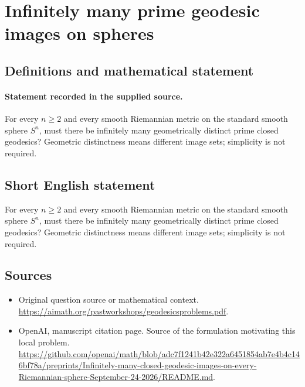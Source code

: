 \documentclass[11pt]{article}
\begin{document}
\section*{Infinitely many prime geodesic images on spheres}\label{30007156}
\subsection{Definitions and mathematical statement}
\paragraph{Statement recorded in the supplied source.}
For every $n\geq 2$ and every smooth Riemannian metric on the standard smooth sphere $S^{n}$, must there be infinitely many geometrically distinct prime closed geodesics? Geometric distinctness means different image sets; simplicity is not required.
\subsection{Short English statement}
For every $n\geq 2$ and every smooth Riemannian metric on the standard smooth sphere $S^{n}$, must there be infinitely many geometrically distinct prime closed geodesics? Geometric distinctness means different image sets; simplicity is not required.
\subsection{Sources}
\begin{itemize}
\item[S1] Original question source or mathematical context.
\url{https://aimath.org/pastworkshops/geodesicsproblems.pdf}.
\item[S2] OpenAI, manuscript citation page. Source of the formulation motivating this local problem.
\url{https://github.com/openai/math/blob/adc7f1241b42e322a6451854ab7e4b4c146bf78a/preprints/Infinitely-many-closed-geodesic-images-on-every-Riemannian-sphere-September-24-2026/README.md}.
\end{itemize}
\end{document}
